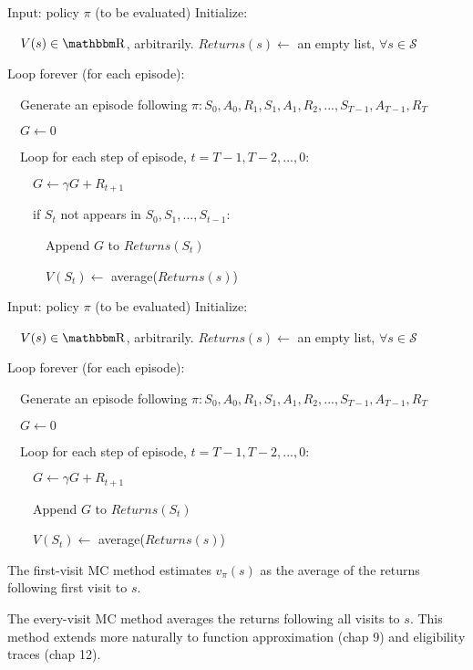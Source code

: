 \documentclass[sutton_barto_notes.tex]{subfiles}
\begin{document}
\begin{tcolorbox}[width=1.1\textwidth,title={First-visit MC prediction, for estimating $V \approx v_\pi$}]
Input: policy $\pi$ (to be evaluated)
Initialize:

$\quad V(s) \in \R$, arbitrarily.
$Returns(s) \leftarrow$ an empty list, $\forall s \in \mathcal{S}$

Loop forever (for each episode):

$\quad$Generate an episode following $\pi : S_0, A_0, R_1, S_1, A_1, R_2, ..., S_{T-1}, A_{T-1}, R_T$

$\quad G \leftarrow 0$

$\quad$Loop for each step of episode, $t = T-1, T-2, ..., 0:$

$\quad\quad G \leftarrow \gamma G + R_{t+1}$

$\quad\quad$if $S_t$ not appears in $S_0, S_1, ..., S_{t-1}:$

$\quad\quad\quad$Append $G$ to $Returns(S_t)$

$\quad\quad\quad V(S_t) \leftarrow$ average($Returns(s)$)
\end{tcolorbox}

\begin{tcolorbox}[width=1.1\textwidth,title={Every-visit MC prediction, for estimating $V \approx v_\pi$}]
Input: policy $\pi$ (to be evaluated)
Initialize:

$\quad V(s) \in \R$, arbitrarily.
$Returns(s) \leftarrow$ an empty list, $\forall s \in \mathcal{S}$

Loop forever (for each episode):

$\quad$Generate an episode following $\pi : S_0, A_0, R_1, S_1, A_1, R_2, ..., S_{T-1}, A_{T-1}, R_T$

$\quad G \leftarrow 0$

$\quad$Loop for each step of episode, $t = T-1, T-2, ..., 0:$

$\quad\quad G \leftarrow \gamma G + R_{t+1}$

$\quad\quad$Append $G$ to $Returns(S_t)$

$\quad\quad V(S_t) \leftarrow$ average($Returns(s)$)
\end{tcolorbox}

The first-visit MC method estimates $v_\pi (s)$ as the average of the returns following first visit to $s$.

The every-visit MC method averages the returns following all visits to $s$. This method extends more naturally to function approximation (chap 9) and eligibility traces (chap 12).
\end{document}
